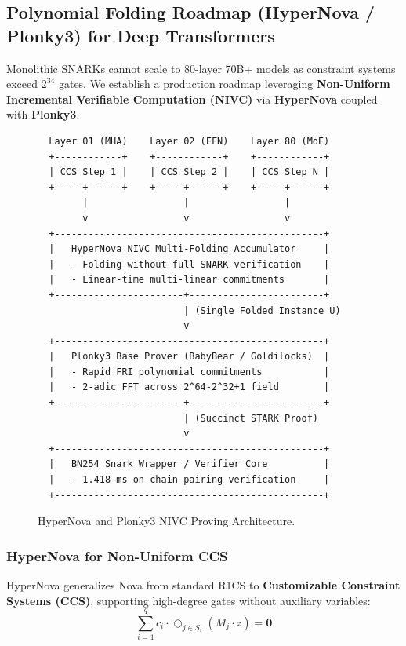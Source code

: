 \documentclass[10pt,twocolumn,letterpaper]{article}
\begin{document}
\subsection{Polynomial Folding Roadmap (HyperNova / Plonky3) for Deep Transformers}
Monolithic SNARKs cannot scale to 80-layer 70B+ models as constraint systems exceed $2^{34}$ gates. We establish a production roadmap leveraging \textbf{Non-Uniform Incremental Verifiable Computation (NIVC)} via \textbf{HyperNova} \cite{kothapalli2022nova} coupled with \textbf{Plonky3}.

\begin{figure}[htbp]
\centering
\begin{verbatim}
  Layer 01 (MHA)    Layer 02 (FFN)    Layer 80 (MoE)
  +------------+    +------------+    +------------+
  | CCS Step 1 |    | CCS Step 2 |    | CCS Step N |
  +-----+------+    +-----+------+    +-----+------+
        |                 |                 |
        v                 v                 v
  +------------------------------------------------+
  |   HyperNova NIVC Multi-Folding Accumulator     |
  |   - Folding without full SNARK verification    |
  |   - Linear-time multi-linear commitments       |
  +-----------------------+------------------------+
                          | (Single Folded Instance U)
                          v
  +------------------------------------------------+
  |   Plonky3 Base Prover (BabyBear / Goldilocks)  |
  |   - Rapid FRI polynomial commitments           |
  |   - 2-adic FFT across 2^64-2^32+1 field        |
  +-----------------------+------------------------+
                          | (Succinct STARK Proof)
                          v
  +------------------------------------------------+
  |   BN254 Snark Wrapper / Verifier Core          |
  |   - 1.418 ms on-chain pairing verification     |
  +------------------------------------------------+
\end{verbatim}
\caption{HyperNova and Plonky3 NIVC Proving Architecture.}
\label{fig:hypernova}
\end{figure}

\subsubsection{HyperNova for Non-Uniform CCS}
HyperNova generalizes Nova from standard R1CS to \textbf{Customizable Constraint Systems (CCS)}, supporting high-degree gates without auxiliary variables:
\begin{equation}
\sum_{i=1}^q c_i \cdot \bigcirc_{j \in S_i} \left( M_j \cdot z \right) = \mathbf{0}
\end{equation}
\end{document}
